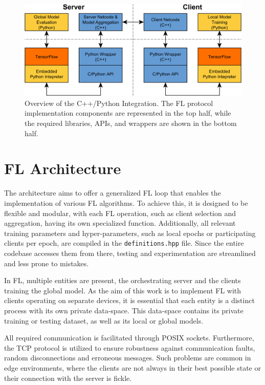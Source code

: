 \begin{figure}[H]
    \centering
        \includegraphics[width=1\textwidth]{Images/block_diagrams/model_lifecycle.png}
        \decoRule
        \caption[C++/Python Integration]{Overview of the C++/Python Integration. The FL protocol implementation components are represented in the top half, while the required libraries, APIs, and wrappers are shown in the bottom half.}
        \label{fig:model_lifecycle}
\end{figure}

\section{FL Architecture}\label{sec:FL_architecture}
The architecture aims to offer a generalized FL loop that enables the implementation of various FL algorithms. To achieve this, it is designed to be flexible and modular, with each FL operation, such as client selection and aggregation, having its own specialized function. Additionally, all relevant training parameters and hyper-parameters, such as local epochs or participating clients per epoch, are compiled in the \texttt{definitions.hpp} file. Since the entire codebase accesses them from there, testing and experimentation are streamlined and less prone to mistakes.

In FL, multiple entities are present, the orchestrating server and the clients training the global model. As the aim of this work is to implement FL with clients operating on separate devices, it is essential that each entity is a distinct process with its own private data-space. This data-space contains its private training or testing dataset, as well as its local or global models.

All required communication is facilitated through POSIX sockets. Furthermore, the TCP protocol is utilized to ensure robustness against communication faults, random disconnections and erroneous messages. Such problems are common in edge environments, where the clients are not always in their best possible state or their connection with the server is fickle. %

